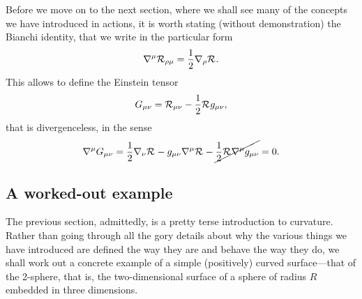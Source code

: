 Before we move on to the next section, where we shall see many of the concepts we
have introduced in actions, it is worth stating (without demonstration) the Bianchi
identity, that we write in the particular form
\begin{align}\label{eq:bianchi_identity}
  \nabla^\mu \mathcal{R}_{\rho\mu} = \frac{1}{2} \nabla_\rho \mathcal{R}_{}.
\end{align}
This allows to define the Einstein tensor
\begin{align}
  G_{\mu\nu} = \mathcal{R}_{\mu\nu} - \frac{1}{2} \mathcal{R}_{} g_{\mu\nu},
\end{align}
that is divergenceless, in the sense
\begin{align*}
  \nabla^\mu G_{\mu\nu} =
  \frac{1}{2}\nabla_\nu \mathcal{R}_{} - g_{\mu\nu} \nabla^\mu \mathcal{R}_{} -
  \cancel{\frac{1}{2}\mathcal{R}_{} \nabla^\mu g_{\mu\nu}} = 0.
\end{align*}



\subsection{A worked-out example}

The previous section, admittedly, is a pretty terse introduction to curvature.
Rather than going through all the gory details about why the various things we
have introduced are defined the way they are and behave the way they do, we shall
work out a concrete example of a simple (positively) curved surface---that of the
2-sphere, that is, the two-dimensional surface of a sphere of radius $R$ embedded
in three dimensions.

